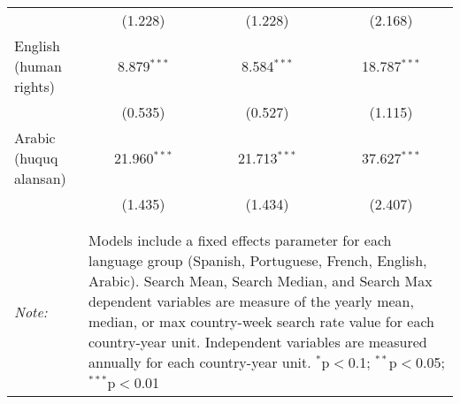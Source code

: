 \begin{table}[!htbp]
\begin{tabular}{@{\extracolsep{5pt}}lccc}
  & (1.228) & (1.228) & (2.168) \\ 
  English (human rights) & 8.879$^{***}$ & 8.584$^{***}$ & 18.787$^{***}$ \\ 
  & (0.535) & (0.527) & (1.115) \\ 
  Arabic (huquq alansan) & 21.960$^{***}$ & 21.713$^{***}$ & 37.627$^{***}$ \\ 
  & (1.435) & (1.434) & (2.407) \\ 
 \hline \\[-1.8ex] 
\hline 
\hline \\[-1.8ex] 
\textit{Note:}  & \multicolumn{3}{l}{\parbox[t]{8cm}{Models include a fixed effects parameter for each language group (Spanish, Portuguese, French, English, Arabic). Search Mean, Search Median, and Search Max dependent variables are measure of the yearly mean, median, or max country-week search rate value for each country-year unit. Independent variables are measured annually for each country-year unit. $^{*}$p$<$0.1; $^{**}$p$<$0.05; $^{***}$p$<$0.01}} \\ 
\end{tabular} 
\end{table} 

